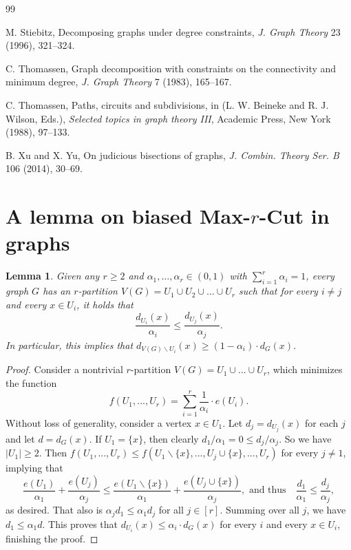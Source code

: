 \documentclass{aic}
\newtheorem{lemma}[dfn]{Lemma}
\begin{document}
\begin{thebibliography}{99}
		
		
		
		
		M. Stiebitz, Decomposing graphs under degree constraints,
		\emph{J. Graph Theory} 23 (1996), 321--324.
		
		C. Thomassen, Graph decomposition with constraints on the connectivity and minimum degree,
		\emph{J. Graph Theory} 7 (1983), 165--167.
		
		C. Thomassen, Paths, circuits and subdivisions, in (L. W. Beineke and R. J. Wilson, Eds.),
		\emph{Selected topics in graph theory III}, Academic Press, New York (1988), 97--133.
		
		
		B. Xu and X. Yu,
		On judicious bisections of graphs,
		\emph{J. Combin. Theory Ser. B} 106 (2014), 30--69.
		
		
	\end{thebibliography}
	
	\appendix
	
	\section{A lemma on biased Max-$r$-Cut in graphs}\label{Sec:App}
	
	\begin{lemma}\label{Lem:max-r-cut}
		Given any $r \geq 2$ and $\alpha_1, \ldots, \alpha_r \in (0,1)$ with $\sum_{i=1}^r \alpha_i = 1$,
		every graph $G$ has an $r$-partition $V(G) = U_1 \cup U_2 \cup \ldots \cup U_r$ such that for every $i \neq j$ and every $x \in U_i$, it holds that
		$$\frac{d_{U_i}(x)}{\alpha_i}\le \frac{d_{U_j}(x)}{\alpha_j}.$$
		In particular, this implies that $d_{V(G)\backslash U_i}(x)\ge (1-\alpha_i)\cdot d_G(x)$.
	\end{lemma}
	\begin{proof}
		Consider a nontrivial $r$-partition $V(G)=U_1\cup ...\cup U_r$, which minimizes the function $$f(U_1,...,U_r)=\sum_{i=1}^r \frac{1}{\alpha_i}\cdot e(U_i).$$
		Without loss of generality, consider a vertex $x\in U_1$.
		Let $d_j=d_{U_j}(x)$ for each $j$ and let $d=d_G(x)$.
		If $U_1=\{x\}$, then clearly $d_1/\alpha_1=0\le d_j/\alpha_j$.
		So we have $|U_1|\ge 2$.
		Then $f(U_1,...,U_r)\leq f(U_1\backslash \{x\},...,U_j\cup \{x\},...,U_r)$ for every $j\neq 1$,
		implying that $$\frac{e(U_1)}{\alpha_1}+\frac{e(U_j)}{\alpha_j}\le \frac{e(U_1\backslash \{x\})}{\alpha_1}+\frac{e(U_j\cup \{x\})}{\alpha_j}, \mbox{ and thus ~ } \frac{d_1}{\alpha_1}\leq \frac{d_j}{\alpha_j},$$
		as desired.
		That also is $\alpha_j d_1\le \alpha_1 d_j$ for all $j\in [r]$.
		Summing over all $j$, we have $d_1\leq \alpha_1 d$.
		This proves that $d_{U_i}(x)\le \alpha_i\cdot d_G(x)$ for every $i$ and every $x\in U_i$, finishing the proof.
	\end{proof}
	
\end{document}
